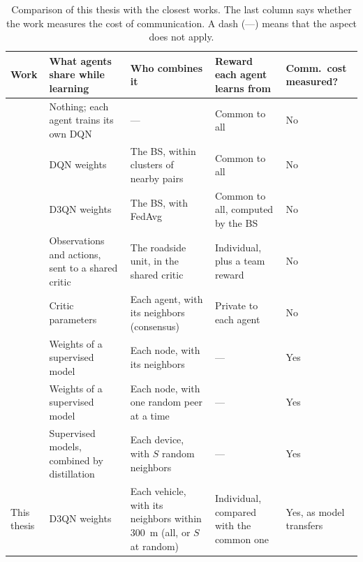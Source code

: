 \begin{table}[tbp]
  \centering
  \linespread{1}\small
  \caption[Comparison with the closest works]{Comparison of this thesis with the closest works. The last
    column says whether the work measures the cost of communication. A dash (---) means that the aspect
    does not apply.}
  \label{tab:rw-positioning}
  \begin{tabularx}{\textwidth}{@{}>{\raggedright\arraybackslash}p{2.1cm}
      >{\raggedright\arraybackslash}X >{\raggedright\arraybackslash}X
      >{\raggedright\arraybackslash}X >{\raggedright\arraybackslash}p{1.6cm}@{}}
    \toprule
    Work & What agents share while learning & Who combines it & Reward each agent learns from
      & Comm.\ cost measured? \\
    \midrule
    \citet{liang+19spectrum} & Nothing; each agent trains its own \acs{DQN} & --- & Common to all
      & No \\
    \addlinespace
    \citet{zhang+20v2xfed} & \acs{DQN} weights & The \acs{BS}, within clusters of nearby pairs
      & Common to all & No \\
    \addlinespace
    \citet{li+22fedmarl} & \acs{D3QN} weights & The \acs{BS}, with \acs{FedAvg} & Common to all,
      computed by the \acs{BS} & No \\
    \addlinespace
    \citet{parvini+23aoi} & Observations and actions, sent to a shared critic & The roadside unit, in the
      shared critic & Individual, plus a team reward & No \\
    \addlinespace
    \citet{zhang+18networked} & Critic parameters & Each agent, with its neighbors (consensus)
      & Private to each agent & No \\
    \addlinespace
    \citet{lian+17dpsgd} & Weights of a supervised model & Each node, with its neighbors & --- & Yes \\
    \addlinespace
    \citet{hegedus+19gossip} & Weights of a supervised model & Each node, with one random peer at a
      time & --- & Yes \\
    \addlinespace
    \citet{ge+24dfl} & Supervised models, combined by distillation & Each device, with $S$ random
      neighbors & --- & Yes \\
    \midrule
    This thesis & \acs{D3QN} weights & Each vehicle, with its neighbors within \SI{300}{\meter} (all,
      or $S$ at random) & Individual, compared with the common one & Yes, as model transfers \\
    \bottomrule
  \end{tabularx}
\end{table}


